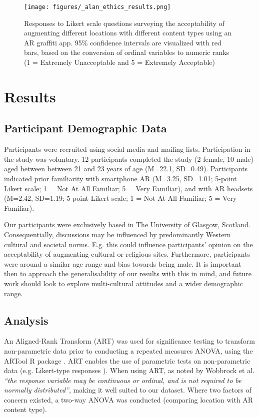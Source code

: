 \begin{figure*} [h]
\begin{center}
\texttt{[image: figures/\_alan\_ethics\_results.png]}
\end{center}
\caption{Responses to Likert scale questions surveying the acceptability of augmenting different locations with different content types using an AR graffiti app. 95\% confidence intervals are visualized with red bars, based on the conversion of ordinal variables to numeric ranks (1 = Extremely Unacceptable and 5 = Extremely Acceptable)}
\label{fig:ethics-results}
\end{figure*}

\section{Results}

\subsection{Participant Demographic Data}
Participants were recruited using social media and mailing lists. 
Participation in the study was voluntary. 
12 participants completed the study (2 female, 10 male) aged between between 21 and 23 years of age (M=22.1, SD=0.49). 
Participants indicated prior familiarity with smartphone AR (M=3.25, SD=1.01; 5-point Likert scale; 1 = Not At All Familiar; 5 = Very Familiar), and with AR headsets (M=2.42, SD=1.19; 5-point Likert scale; 1 = Not At All Familiar; 5 = Very Familiar). 

Our participants were exclusively based in The University of Glasgow, Scotland.
Consequentially, discussions may be influenced by predominantly Western cultural and societal norms. 
E.g. this could influence participants' opinion on the acceptability of augmenting cultural or religious sites. 
Furthermore, participants were around a similar age range and bias towards being male. 
It is important then to approach the generalisability of our results with this in mind, and future work should look to explore multi-cultural attitudes and a wider demographic range. 


\subsection{Analysis}
An Aligned-Rank Transform (ART) \cite{results_1} was used for significance testing to transform non-parametric data prior to conducting a repeated measures ANOVA, using the ARTool R package \cite{results_2}. 
ART enables the use of parametric tests on non-parametric data (e.g. Likert-type responses \cite{likert}). 
When using ART, as noted by Wobbrock et al. \cite{wobbrockART} \textit{``the response variable may be continuous or ordinal, and is not required to be normally distributed''}, making it well suited to our dataset. 
Where two factors of concern existed, a two-way ANOVA was conducted (comparing location with AR content type). 

